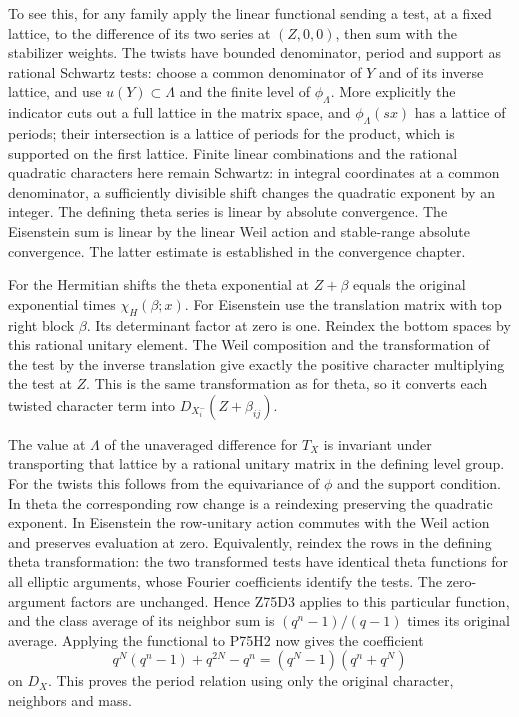 To see this, for any family apply the linear functional sending a
test, at a fixed lattice, to the difference of its two series at
$(Z,0,0)$, then sum with the stabilizer weights. The twists have
bounded denominator, period and support as rational Schwartz tests:
choose a common denominator of $Y$ and of its inverse lattice, and
use $u(Y)\subset\Lambda$ and the finite level of $\phi_\Lambda$.
More explicitly the indicator cuts out a full lattice in the matrix
space, and $\phi_\Lambda(sx)$ has a lattice of periods; their
intersection is a lattice of periods for the product, which is
supported on the first lattice. Finite linear combinations and the
rational quadratic characters here remain Schwartz: in integral
coordinates at a common denominator, a sufficiently divisible shift
changes the quadratic exponent by an integer. The defining theta
series is linear by absolute convergence. The Eisenstein sum is
linear by the linear Weil action and stable-range absolute convergence.
The latter estimate is established in the convergence chapter.

For the Hermitian shifts the theta exponential at $Z+\beta$
equals the original exponential times $\chi_H(\beta;x)$.
For Eisenstein use the translation matrix with top right block
$\beta$. Its determinant factor at zero is one. Reindex the bottom
spaces by this rational unitary element. The Weil composition and
the transformation of the test by the inverse translation give
exactly the positive character multiplying the test at $Z$.
This is the same transformation as for theta, so it converts each
twisted character term into $D_{X_i^-}(Z+\beta_{ij})$.

The value at $\Lambda$ of the unaveraged difference for $T_X$ is
invariant under transporting that lattice by a rational unitary
matrix in the defining level group. For the twists this follows
from the equivariance of $\phi$ and the support condition. In
theta the corresponding row change is a reindexing preserving
the quadratic exponent. In Eisenstein the row-unitary action
commutes with the Weil action and preserves evaluation at zero.
Equivalently, reindex the rows in the defining theta transformation:
the two transformed tests have identical theta functions for all
elliptic arguments, whose Fourier coefficients identify the tests.
The zero-argument factors are unchanged. Hence Z75D3 applies to
this particular function, and the class average of its neighbor sum
is $(q^n-1)/(q-1)$ times its original average. Applying the functional
to P75H2 now gives the coefficient
\[
     q^N(q^n-1)+q^{2N}-q^n=(q^N-1)(q^n+q^N)
\]
on $D_X$. This proves the period relation using only the original
character, neighbors and mass.
